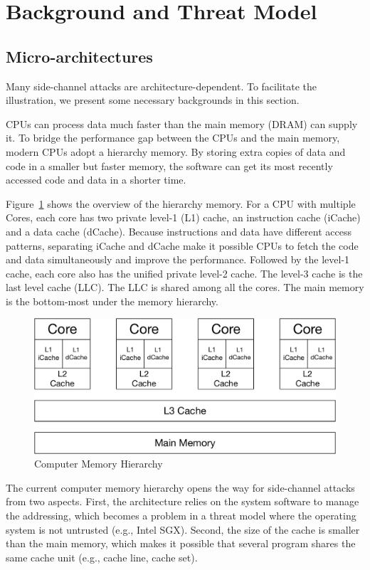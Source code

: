 \section{Background and Threat Model}
\subsection{Micro-architectures}
Many side-channel attacks are architecture-dependent. To facilitate the illustration, we present some necessary backgrounds in this section.

CPUs can process data much faster than the main memory (DRAM) can supply it. To bridge the performance gap between the CPUs and the main memory, modern CPUs adopt a hierarchy memory. By storing extra copies of data and code in a smaller but faster memory, the software can get its most recently accessed code and data in a shorter time.

Figure~\ref{fig:memory_hierarchy} shows the overview of the hierarchy memory. For a CPU with multiple Cores, each core has two private level-1 (L1) cache, an instruction cache (iCache) and a data cache (dCache). Because instructions and data have different access patterns, separating iCache and dCache make it possible CPUs to fetch the code and data simultaneously and improve the performance. Followed by the level-1 cache, each core also has the unified private level-2 cache. The level-3 cache is the last level cache (LLC). The LLC is shared among all the cores. The main memory is the bottom-most under the memory hierarchy. 
\begin{figure}
    \centering
    \includegraphics[width=.65\columnwidth]{./figures/chapter3/architecture.pdf}
    \caption{Computer Memory Hierarchy}\label{fig:memory_hierarchy}
\end{figure}

The current computer memory hierarchy opens the way for side-channel attacks from two aspects. First, the architecture relies on the system software to manage the addressing, which becomes a problem in a threat model where the operating system is not untrusted (e.g., Intel SGX). Second, the size of the cache is smaller than the main memory, which makes it possible that several program shares the same cache unit (e.g., cache line, cache set).

